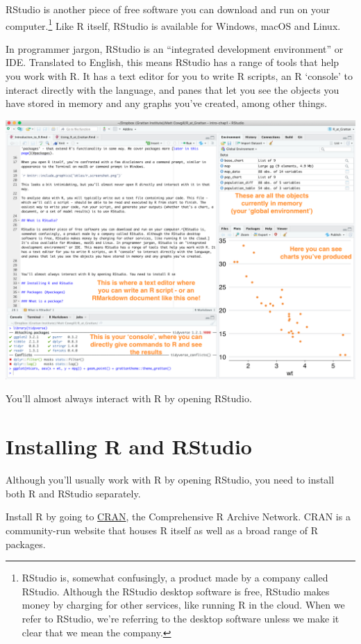 \documentclass[]{book}
\let\rmarkdownfootnote\footnote%
\def\footnote{\protect\rmarkdownfootnote}
\begin{document}
RStudio is another piece of free software you can download and run on your computer.\footnote{RStudio is, somewhat confusingly, a product made by a company called RStudio. Although the RStudio desktop software is free, RStudio makes money by charging for other services, like running R in the cloud. When we refer to RStudio, we're referring to the desktop software unless we make it clear that we mean the company.} Like R itself, RStudio is available for Windows, macOS and Linux.

In programmer jargon, RStudio is an ``integrated development environment'' or IDE. Translated to English, this means RStudio has a range of tools that help you work with R. It has a text editor for you to write R scripts, an R `console' to interact directly with the language, and panes that let you see the objects you have stored in memory and any graphs you've created, among other things.

\includegraphics[width=18.4in]{atlas/rstudio_screenshot}

You'll almost always interact with R by opening RStudio.

\hypertarget{installing-r-and-rstudio}{%
\section{Installing R and RStudio}\label{installing-r-and-rstudio}}

Although you'll usually work with R by opening RStudio, you need to install both R and RStudio separately.

Install R by going to \href{https://cran.r-project.org}{CRAN}, the Comprehensive R Archive Network. CRAN is a community-run website that houses R itself as well as a broad range of R packages.
\end{document}
